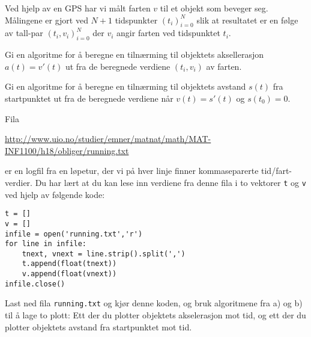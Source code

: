 \documentclass[11pt,norsk,a4paper]{article}
\begin{document}
\begin{oppgaver}
\oppgave Ved hjelp av en GPS har vi målt farten $v$ til et objekt som beveger seg. Målingene er gjort ved $N+1$ tidspunkter $(t_i)_{i=0}^N$ slik at resultatet er en følge av tall-par $(t_i,v_i)_{i=0}^N$ der $v_i$ angir farten ved tidspunktet $t_i$.

\begin{deloppgaver}
\oppgave Gi en algoritme for å beregne en tilnærming til objektets aksellerasjon $a(t)=v'(t)$ ut fra de beregnede verdiene $(t_i,v_i)$ av farten.

\oppgave Gi en algoritme for å beregne en tilnærming til objektets avstand $s(t)$ fra startpunktet ut fra de beregnede verdiene når $v(t)=s'(t)$ og $s(t_0)=0$.

\oppgave Fila 
\begin{center}
\url{http://www.uio.no/studier/emner/matnat/math/MAT-INF1100/h18/obliger/running.txt} 
\end{center}
er en logfil fra en løpetur, der vi på hver linje finner kommaseparerte tid/fart-verdier. Du har lært at du kan lese inn verdiene fra denne fila i to
vektorer {\tt t} og {\tt v} ved hjelp av følgende kode:
\begin{lstlisting}
t = []
v = []
infile = open('running.txt','r')
for line in infile:
    tnext, vnext = line.strip().split(',')
    t.append(float(tnext))
    v.append(float(vnext))
infile.close()
\end{lstlisting}
Last ned fila {\tt running.txt} og kjør denne koden, og bruk algoritmene fra a) og b) til å lage to plott: Ett der du plotter objektets akselerasjon mot tid, og ett der du plotter
objektets avstand fra startpunktet mot tid.
\end{deloppgaver}






\end{oppgaver}
\end{document}
